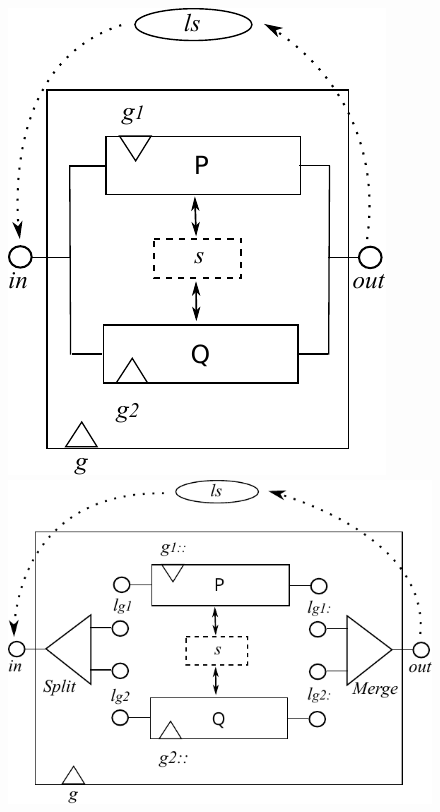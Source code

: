 \begin{figure}[h]%
  \centering
  \parbox{1.2in}{\includegraphics[scale=0.4]{images/nondet-actual}}%
  \qquad\qquad
  \begin{minipage}{1.2in}%
    \includegraphics[scale=0.4]{images/par-comp-actual}
  \end{minipage}%
  \label{fig:new-and-split}%
\end{figure}

